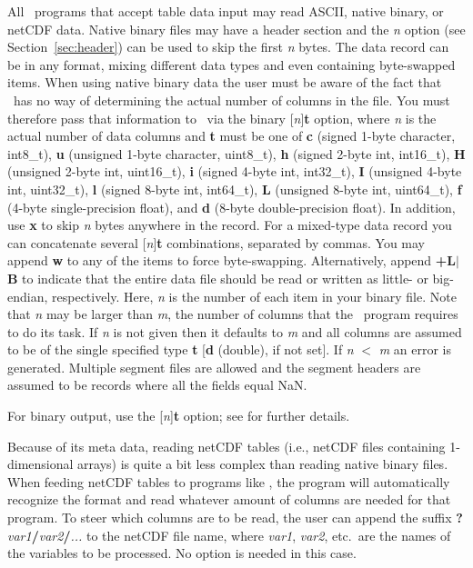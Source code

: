 All \GMT\ programs that accept table data input may read ASCII,
native binary, or netCDF data.  Native binary files may have a header section
and the \emph{n} option (see Section~\ref{sec:header}) can be used to skip the first
\emph{n} bytes.  The data record can be in any format, mixing
different data types and even containing byte-swapped items.  When
using native binary data the user must be aware of the fact that
\GMT\ has no way of determining the actual number of columns in
the file.  You must therefore pass that information to \GMT\ via
the binary [\emph{n}]\textbf{t} option, where \emph{n} is
the actual number of data columns and \textbf{t} must be one of
\textbf{c} (signed 1-byte character, int8\_t), \textbf{u} (unsigned
1-byte character, uint8\_t), \textbf{h} (signed 2-byte int,
int16\_t), \textbf{H} (unsigned 2-byte int, uint16\_t), \textbf{i}
(signed 4-byte int, int32\_t), \textbf{I} (unsigned 4-byte int,
uint32\_t), \textbf{l} (signed 8-byte int, int64\_t), \textbf{L}
(unsigned 8-byte int, uint64\_t), \textbf{f} (4-byte
single-precision float), and \textbf{d} (8-byte double-precision
float).  In addition, use \textbf{x} to skip \emph{n} bytes anywhere in the record.
For a mixed-type data record you can concatenate several
[\emph{n}]\textbf{t} combinations, separated by commas.  You may
append \textbf{w} to any of the items to force byte-swapping.
Alternatively, append \textbf{+L}$|$\textbf{B} to indicate that
the entire data file should be read or written as little- or
big-endian, respectively.  Here, \emph{n} is the number of each
item in your binary file.  Note that \emph{n} may be larger than
\emph{m}, the number of columns that the \GMT\ program requires to
do its task.  If \emph{n} is not given then it defaults to
\emph{m} and all columns are assumed to be of the single specified
type \textbf{t} [\textbf{d} (double), if not set].  If \emph{n}
$<$ \emph{m} an error is generated.  Multiple segment files are
allowed and the segment headers are assumed to be records where
all the fields equal NaN.

For binary output, use the [\emph{n}]\textbf{t} option;
see  for further details.

Because of its meta data, reading netCDF tables (i.e., netCDF
files containing 1-dimensional arrays) is quite a bit less complex
than reading native binary files. When feeding netCDF tables to
programs like , the program will automatically
recognize the format and read whatever amount of columns are
needed for that program. To steer which columns are to be read,
the user can append the suffix
\textbf{?}\emph{var1}\textbf{/}\emph{var2}\textbf{/}\emph{...} to
the netCDF file name, where \emph{var1}, \emph{var2}, etc.\ are
the names of the variables to be processed. No  option is
needed in this case.

